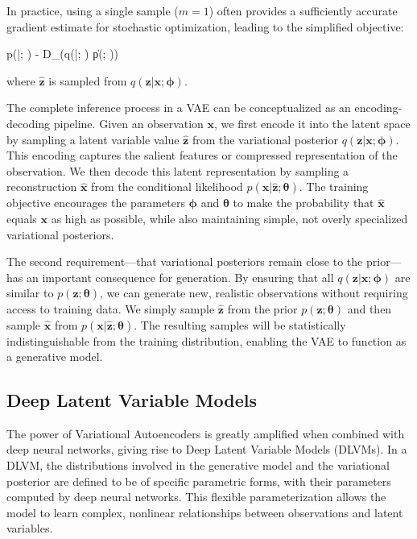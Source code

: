 In practice, using a single sample ($m=1$) often provides a sufficiently accurate gradient estimate for stochastic optimization, leading to the simplified objective:
\begin{myequation}
\log p(|; \boldsymbol{\theta}) - D_{}(q(|; \boldsymbol{\phi}) \| p(; \boldsymbol{\theta}))
\end{myequation}

where $\hat{\mathbf{z}}$ is sampled from $q(\mathbf{z}|\mathbf{x}; \boldsymbol{\phi})$.

The complete inference process in a VAE can be conceptualized as an encoding-decoding pipeline. Given an observation $\mathbf{x}$, we first encode it into the latent space by sampling a latent variable value $\hat{\mathbf{z}}$ from the variational posterior $q(\mathbf{z}|\mathbf{x}; \boldsymbol{\phi})$. This encoding captures the salient features or compressed representation of the observation. We then decode this latent representation by sampling a reconstruction $\hat{\mathbf{x}}$ from the conditional likelihood $p(\mathbf{x}|\hat{\mathbf{z}}; \boldsymbol{\theta})$. The training objective encourages the parameters $\boldsymbol{\phi}$ and $\boldsymbol{\theta}$ to make the probability that $\hat{\mathbf{x}}$ equals $\mathbf{x}$ as high as possible, while also maintaining simple, not overly specialized variational posteriors.

The second requirement—that variational posteriors remain close to the prior—has an important consequence for generation. By ensuring that all $q(\mathbf{z}|\mathbf{x}; \boldsymbol{\phi})$ are similar to $p(\mathbf{z}; \boldsymbol{\theta})$, we can generate new, realistic observations without requiring access to training data. We simply sample $\hat{\mathbf{z}}$ from the prior $p(\mathbf{z}; \boldsymbol{\theta})$ and then sample $\hat{\mathbf{x}}$ from $p(\mathbf{x}|\hat{\mathbf{z}}; \boldsymbol{\theta})$. The resulting samples will be statistically indistinguishable from the training distribution, enabling the VAE to function as a generative model.

\subsection*{Deep Latent Variable Models}

The power of Variational Autoencoders is greatly amplified when combined with deep neural networks, giving rise to Deep Latent Variable Models (DLVMs). In a DLVM, the distributions involved in the generative model and the variational posterior are defined to be of specific parametric forms, with their parameters computed by deep neural networks. This flexible parameterization allows the model to learn complex, nonlinear relationships between observations and latent variables.

